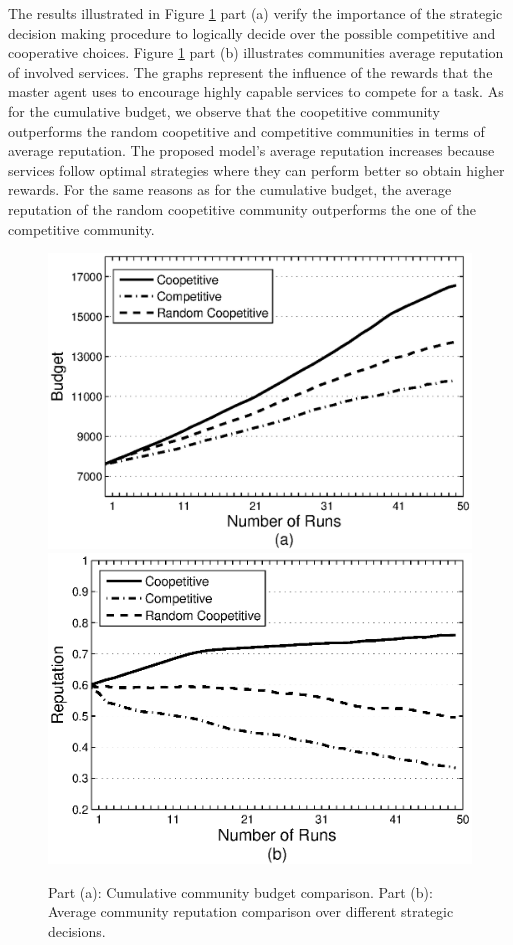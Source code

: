 The results illustrated in Figure \ref{Graph1} part (a)  verify
the importance of the strategic decision making procedure to
logically decide over the possible competitive and cooperative
choices. Figure \ref{Graph1} part (b) illustrates communities
average reputation of involved services. The graphs represent the
influence of the rewards that the master agent uses to encourage
highly capable services to compete for a task. As for the
cumulative budget, we observe that the coopetitive community
outperforms the random coopetitive and competitive communities in
terms of average reputation. The proposed model's average
reputation increases because services follow optimal strategies
where they can perform better so obtain higher rewards. For the
same reasons as for the cumulative budget, the average reputation
of the random coopetitive community
outperforms the one of the competitive community. %


\begin{figure}%
\includegraphics[scale=0.47]{Figures/graphbgtmed.eps}
\includegraphics[scale=0.47]{Figures/graphrep.eps}
\caption{Part (a): Cumulative community budget comparison. Part
(b): Average community reputation comparison over different
strategic decisions.} \label{Graph1}
\end{figure}



